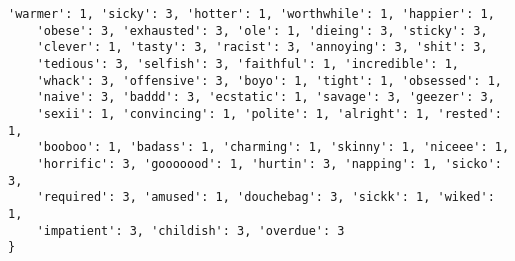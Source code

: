 \begin{lstlisting}[caption={\textit{sentiment\_words.py}: sentiment words}]
    'warmer': 1, 'sicky': 3, 'hotter': 1, 'worthwhile': 1, 'happier': 1,
    'obese': 3, 'exhausted': 3, 'ole': 1, 'dieing': 3, 'sticky': 3,
    'clever': 1, 'tasty': 3, 'racist': 3, 'annoying': 3, 'shit': 3,
    'tedious': 3, 'selfish': 3, 'faithful': 1, 'incredible': 1,
    'whack': 3, 'offensive': 3, 'boyo': 1, 'tight': 1, 'obsessed': 1,
    'naive': 3, 'baddd': 3, 'ecstatic': 1, 'savage': 3, 'geezer': 3,
    'sexii': 1, 'convincing': 1, 'polite': 1, 'alright': 1, 'rested': 1,
    'booboo': 1, 'badass': 1, 'charming': 1, 'skinny': 1, 'niceee': 1,
    'horrific': 3, 'gooooood': 1, 'hurtin': 3, 'napping': 1, 'sicko': 3,
    'required': 3, 'amused': 1, 'douchebag': 3, 'sickk': 1, 'wiked': 1,
    'impatient': 3, 'childish': 3, 'overdue': 3
}
	\end{lstlisting}
